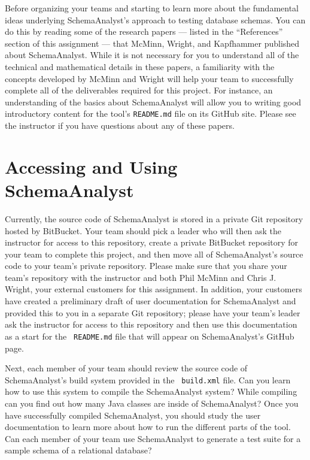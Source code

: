 Before organizing your teams and starting to learn more about the fundamental ideas underlying SchemaAnalyst's approach
to testing database schemas. You can do this by reading some of the research papers --- listed in the ``References''
section of this assignment --- that McMinn, Wright, and Kapfhammer published about SchemaAnalyst. While it is not
necessary for you to understand all of the technical and mathematical details in these papers, a familiarity with the
concepts developed by McMinn and Wright will help your team to successfully complete all of the deliverables required
for this project. For instance, an understanding of the basics about SchemaAnalyst will allow you to writing good
introductory content for the tool's {\tt README.md} file on its GitHub site. Please see the instructor if you have
questions about any of these papers.

\vspace*{-.05in}
\section*{Accessing and Using SchemaAnalyst}

Currently, the source code of SchemaAnalyst is stored in a private Git repository hosted by BitBucket. Your team should
pick a leader who will then ask the instructor for access to this repository, create a private BitBucket repository for
your team to complete this project, and then move all of SchemaAnalyst's source code to your team's private repository.
Please make sure that you share your team's repository with the instructor and both Phil McMinn and Chris J.
Wright, your external customers for this assignment. In addition, your customers have created a preliminary draft of
user documentation for SchemaAnalyst and provided this to you in a separate Git repository; please have your team's
leader ask the instructor for access to this repository and then use this documentation as a start for the {\tt
README.md} file that will appear on SchemaAnalyst's GitHub page.

Next, each member of your team should review the source code of SchemaAnalyst's build system provided in the {\tt
build.xml} file. Can you learn how to use this system to compile the SchemaAnalyst system? While compiling can you find
out how many Java classes are inside of SchemaAnalyst? Once you have successfully compiled SchemaAnalyst, you should
study the user documentation to learn more about how to run the different parts of the tool. Can each member of your
team use SchemaAnalyst to generate a test suite for a sample schema of a relational database?

